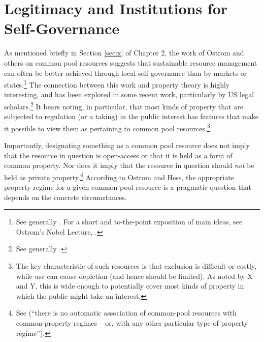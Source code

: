 \section{Legitimacy and Institutions for Self-Governance}\label{sec:lad}

As mentioned briefly in Section \ref{sec:x} of Chapter 2, the work of Ostrom and others on common pool resources suggests that sustainable resource management can often be better achieved through local self-governance than by markets or states.\footnote{See generally \cite{....}. For a short and to-the-point exposition of main ideas, see Ostrom's Nobel Lecture, \cite{...}.} The connection between this work and property theory is highly interesting, and has been explored in some recent work, particularly by US legal scholars.\footnote{See generally \cite{rose...}.} It bears noting, in particular, that most kinds of property that are subjected to regulation (or a taking) in the public interest has features that make it possible to view them as pertaining to common pool resources.\footnote{The key characteristic of such resources is that exclusion is difficult or costly, while use can cause depletion (and hence should be limited). As noted by X and Y, this is wide enough to potentially cover most kinds of property in which the public might take an interest.}

Importantly, designating something as a common pool resource does not imply that the resource in question is open-access or that it is held as a form of common property. Nor does it imply that the resource in question should  {\it not} be held as private property.\footnote{See \cite{ostrom07} (``there is no automatic association of common-pool resources with common-property regimes -- or, with any other particular type of property regime'').} According to Ostrom and Hess, the appropriate  property regime for a given common pool resource is a pragmatic question that depends on the concrete circumstances.



